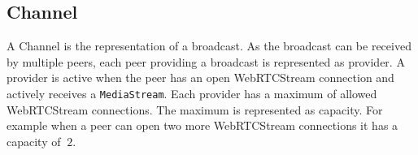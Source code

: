 \subsection{Channel}
A Channel is the representation of a broadcast. As the broadcast can be received by multiple peers, each peer providing a broadcast is represented as provider. A provider is active when the peer has an open WebRTCStream connection and actively receives a \lstinline|MediaStream|. Each provider has a maximum of allowed WebRTCStream connections. The maximum is represented as capacity. For example when a peer can open two more WebRTCStream connections it has a capacity of $\ 2 $.